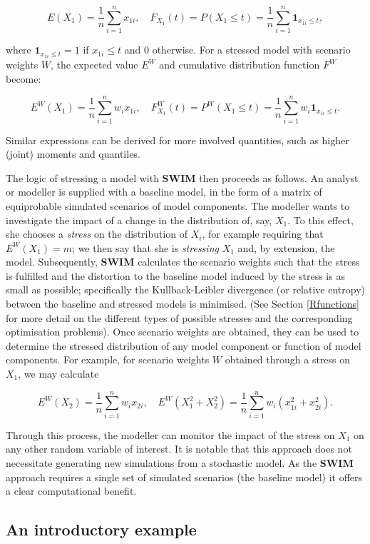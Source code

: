 \documentclass[
]{article}
\begin{document}
\[
E(X_1)=\frac 1  n \sum_{i=1}^nx_{1i},\quad F_{X_1}(t)= P(X_1\leq t)=\frac 1 n \sum_{i=1}^n \mathbf 1 _{x_{1i}\leq t},
\]

where \(\mathbf 1 _{x_{1i}\leq t}=1\) if \(x_{1i}\leq t\) and \(0\) otherwise. For a stressed model with scenario weights \(W\), the expected value \(E^W\) and cumulative distribution function \(F^W\) become:

\[
E^W(X_1)=\frac 1  n \sum_{i=1}^n w_i x_{1i},\quad F_{X_1}^W(t)=P^W(X_1\leq t)=\frac 1 n \sum_{i=1}^n w_i \mathbf 1 _{x_{1i}\leq t}.
\]

Similar expressions can be derived for more involved quantities, such as higher (joint) moments and quantiles.

The logic of stressing a model with \textbf{SWIM} then proceeds as follows. An analyst or modeller is supplied with a baseline model, in the form of a matrix of equiprobable simulated scenarios of model components. The modeller wants to investigate the impact of a change in the distribution of, say, \(X_1\). To this effect, she chooses a \emph{stress} on the distribution of \(X_i\), for example requiring that \(E^W(X_1)=m\); we then say that she is \emph{stressing} \(X_1\) and, by extension, the model. Subsequently, \textbf{SWIM} calculates the scenario weights such that the stress is fulfilled and the distortion to the baseline model induced by the stress is as small as possible; specifically the Kullback-Leibler divergence (or relative entropy) between the baseline and stressed models is minimised. (See Section \ref{Rfunctions} for more detail on the different types of possible stresses and the corresponding optimisation problems). Once scenario weights are obtained, they can be used to determine the stressed distribution of any model component or function of model components. For example, for scenario weights \(W\) obtained through a stress on \(X_1\), we may calculate

\[
E^W(X_2)=\frac 1  n\sum_{i=1}^n w_i x_{2i},\quad E^W(X_1^2+X_2^2)=\frac 1  n \sum_{i=1}^n w_i \left(x_{1i}^2+ x_{2i}^2 \right).
\]

Through this process, the modeller can monitor the impact of the stress on \(X_1\) on any other random variable of interest. It is notable that this approach does not necessitate generating new simulations from a stochastic model. As the \textbf{SWIM} approach requires a single set of simulated scenarios (the baseline model) it offers a clear computational benefit.

\hypertarget{an-introductory-example}{%
\subsection{An introductory example}\label{an-introductory-example}}
\end{document}
